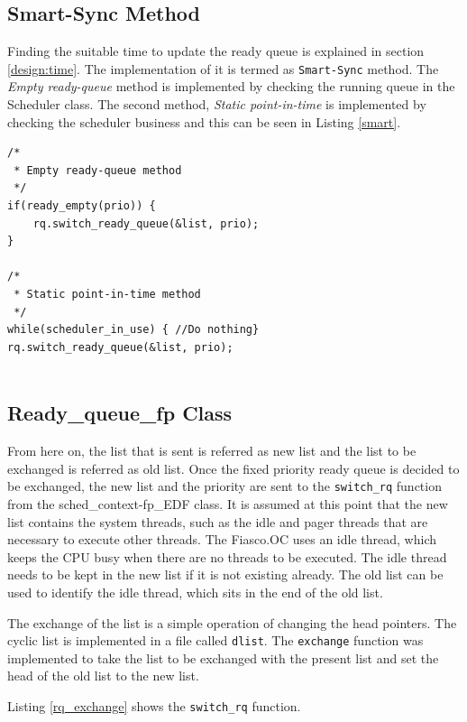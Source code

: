 \subsection{Smart-Sync Method}
Finding the suitable time to update the ready queue is explained in section \ref{design:time}. The implementation of it is termed as \texttt{Smart-Sync} method. The \textit{Empty ready-queue} method is implemented by checking the running queue in the Scheduler class. The second method, \textit{Static point-in-time} is implemented by checking the scheduler business and this can be seen in Listing \ref{smart}.  

\begin{lstlisting}[label={smart}, style=customcpp]
/*
 * Empty ready-queue method
 */
if(ready_empty(prio)) {
	rq.switch_ready_queue(&list, prio);
}

/*
 * Static point-in-time method
 */
while(scheduler_in_use) { //Do nothing}
rq.switch_ready_queue(&list, prio);


\end{lstlisting} 

\subsection{Ready\_queue\_fp Class} \label{imp:rqfp}
From here on, the list that is sent is referred as new list and the list to be exchanged is referred as old list. Once the fixed priority ready queue is decided to be exchanged, the new list and the priority are sent to the \texttt{switch\_rq} function from the sched\_context-fp\_EDF class. It is assumed at this point that the new list contains the system threads, such as the idle and pager threads that are necessary to execute other threads. The Fiasco.OC uses an idle thread, which keeps the CPU busy when there are no threads to be executed. The idle thread needs to be kept in the new list if it is not existing already. The old list can be used to identify the idle thread, which sits in the end of the old list.

The exchange of the list is a simple operation of changing the head pointers. The cyclic list is implemented in a file called \texttt{dlist}. The \texttt{exchange} function was implemented to take the list to be exchanged with the present list and set the head of the old list to the new list. 

Listing \ref{rq_exchange} shows the \texttt{switch\_rq} function.

